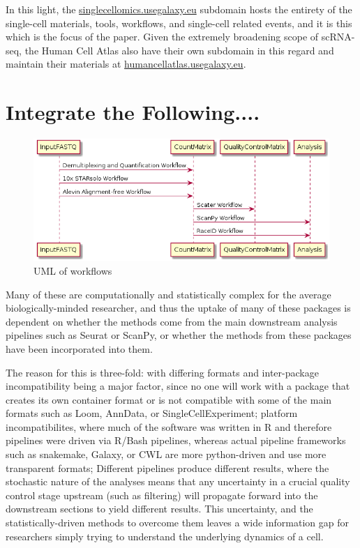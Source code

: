 \documentclass[a4paper,num-refs]{oup-contemporary}
\begin{document}
In this light, the \url{singlecellomics.usegalaxy.eu} subdomain hosts the entirety of the single-cell materials, tools, workflows, and single-cell related events, and it is this which is the focus of the paper. Given the extremely broadening scope of scRNA-seq, the Human Cell Atlas also have their own subdomain in this regard and maintain their materials at \url{humancellatlas.usegalaxy.eu}.






\section{Integrate the Following....}

\begin{figure}[bt!] %
\centering
\includegraphics[width=\linewidth]{workflows}
\caption{UML of workflows}\label{fig:example}
\end{figure}

Many of these are computationally and statistically complex for the average biologically-minded researcher, and thus the uptake of many of these packages is dependent on whether the methods come from the main downstream analysis pipelines such as Seurat or ScanPy, or whether the methods from these packages have been incorporated into them.

The reason for this is three-fold: with differing formats and inter-package incompatibility being a major factor, since no one will work with a package that creates its own container format or is not compatible with some of the main formats such as Loom, AnnData, or SingleCellExperiment; platform incompatibilites, where much of the software was written in R and therefore pipelines were driven via R/Bash pipelines, whereas actual pipeline frameworks such as snakemake, Galaxy, or CWL are more python-driven and use more transparent formats; Different pipelines produce different results, where the stochastic nature of the analyses means that any uncertainty in a crucial quality control stage upstream (such as filtering) will propagate forward into the downstream sections to yield different results. This uncertainty, and the statistically-driven methods to overcome them leaves a wide information gap for researchers simply trying to understand the underlying dynamics of a cell.
\end{document}
